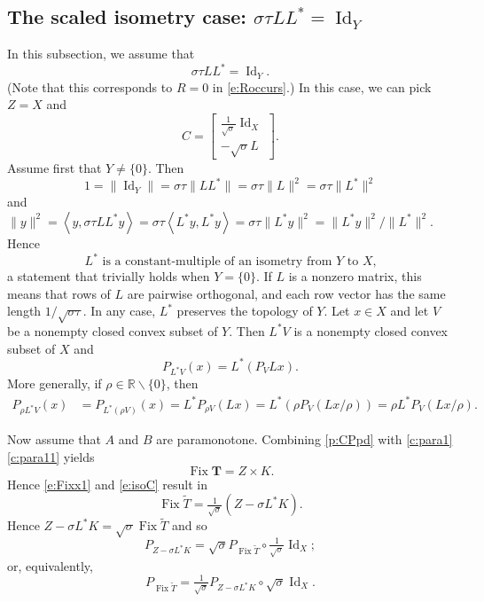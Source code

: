 \documentclass{article}
\newcommand{\scal}[2]{\left\langle{#1},{#2}  \right\rangle}
\newcommand{\Tt}{\ensuremath{\widetilde{T}}}
\newcommand{\RR}{\ensuremath{\mathbb R}}
\newcommand{\Fix}{\ensuremath{\operatorname{Fix}}}
\newcommand{\Id}{\ensuremath{\operatorname{Id}}}
\newcommand{\bT}{\ensuremath{{\mathbf{T}}}}
\begin{document}
\subsection{The scaled isometry case: $\sigma\tau LL^*=\Id_Y$}

\label{ss:scalediso}

In this subsection, we assume that 
\begin{equation}
\sigma\tau LL^* = \Id_Y.
\end{equation}
(Note that this corresponds to $R=0$ in \cref{e:Roccurs}.) 
In this case, we can pick $Z=X$ and 
\begin{equation}
\label{e:isoC}
C = \begin{bmatrix}
\tfrac{1}{\sqrt{\sigma}}\Id_X \\
-\sqrt{\sigma}L
\end{bmatrix}. 
\end{equation}
Assume first that 
$Y\neq \{0\}$. 
Then
\begin{equation}
1 = \|\Id_Y\| 
= \sigma\tau\|LL^*\|
= \sigma\tau\|L\|^2
= \sigma\tau\|L^*\|^2
\end{equation}
and 
$\|y\|^2 = \scal{y}{\sigma\tau LL^*y}
= \sigma\tau \scal{L^*y}{L^*y}=\sigma\tau\|L^*y\|^2
=\|L^*y\|^2/\|L^*\|^2$. 
Hence 
\begin{equation}
\text{$L^*$ is a constant-multiple of an isometry from $Y$ to $X$,}
\end{equation}
a statement that trivially holds when $Y=\{0\}$. 
If $L$ is a nonzero matrix, this means that rows of $L$ are pairwise orthogonal,
and each row vector has the same length $1/\sqrt{\sigma\tau}$. 
In any case, $L^*$ preserves the topology of $Y$.
Let $x\in X$ and let 
$V$ be a nonempty closed convex subset of $Y$. 
Then $L^*V$ is a nonempty closed convex subset of $X$ and 
\begin{equation}
P_{L^*V}(x) = L^*(P_VLx).
\end{equation}
More generally, if $\rho\in\RR\smallsetminus\{0\}$, then 
\begin{align}
\label{e:241124a}
P_{\rho L^*V}(x) 
&= P_{L^*(\rho V)}(x)
= L^*P_{\rho V}(Lx)
= L^*(\rho P_V(Lx/\rho))
= \rho L^*P_V(Lx/\rho). 
\end{align}

Now assume that $A$ and $B$ are paramonotone. 
Combining \cref{p:CPpd} with \cref{c:para1}\cref{c:para11} 
yields 
\begin{equation}
\label{e:Fixx6}
\Fix \bT = Z\times K. 
\end{equation}
Hence \cref{e:Fixx1} and \cref{e:isoC} result in 
\begin{equation}
\label{e:Fixx2}
\Fix \Tt = \tfrac{1}{\sqrt{\sigma}}(Z-\sigma L^*K). 
\end{equation}
Hence $Z-\sigma L^*K = \sqrt{\sigma} \Fix\Tt$ and so 
\begin{equation}
\label{e:Fixx4}
P_{Z-\sigma L^*K} 
= \sqrt{\sigma} P_{\Fix\Tt}\circ \tfrac{1}{\sqrt{\sigma}}\Id_X; 
\end{equation}
or, equivalently, 
\begin{equation}
\label{e:Fixx5}
P_{\Fix\Tt} = \tfrac{1}{\sqrt{\sigma}} P_{Z-\sigma L^*K}\circ \sqrt{\sigma}\Id_X.
\end{equation}
\end{document}
